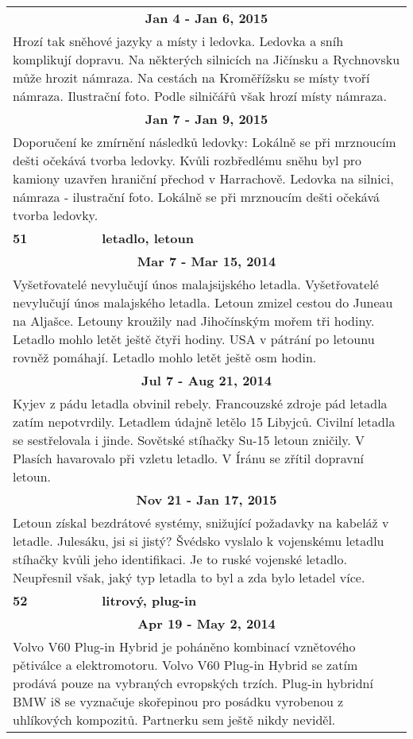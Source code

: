 \begin{tabularx}{\linewidth}{l l}
\multicolumn{2}{c}{\bf Jan 4 - Jan 6, 2015} \\
\multicolumn{2}{p{\linewidth}}{Hrozí tak sněhové jazyky a místy i ledovka. Ledovka a sníh komplikují dopravu. Na některých silnicích na Jičínsku a Rychnovsku může hrozit námraza. Na cestách na Kroměřížsku se místy tvoří námraza. Ilustrační foto. Podle silničářů však hrozí místy námraza.} \\ \midrule
\multicolumn{2}{c}{\bf Jan 7 - Jan 9, 2015} \\
\multicolumn{2}{p{\linewidth}}{Doporučení ke zmírnění následků ledovky: Lokálně se při mrznoucím dešti očekává tvorba ledovky. Kvůli rozbředlému sněhu byl pro kamiony uzavřen hraniční přechod v Harrachově. Ledovka na silnici, námraza - ilustrační foto. Lokálně se při mrznoucím dešti očekává tvorba ledovky.} \\ \midrule[1.5pt]

\bf 51 & \bf letadlo, letoun \\ \midrule
\multicolumn{2}{c}{\bf Mar 7 - Mar 15, 2014} \\
\multicolumn{2}{p{\linewidth}}{Vyšetřovatelé nevylučují únos malajsijského letadla. Vyšetřovatelé nevylučují únos malajského letadla. Letoun zmizel cestou do Juneau na Aljašce. Letouny kroužily nad Jihočínským mořem tři hodiny. Letadlo mohlo letět ještě čtyři hodiny. USA v pátrání po letounu rovněž pomáhají. Letadlo mohlo letět ještě osm hodin.} \\ \midrule
\multicolumn{2}{c}{\bf Jul 7 - Aug 21, 2014} \\
\multicolumn{2}{p{\linewidth}}{Kyjev z pádu letadla obvinil rebely. Francouzské zdroje pád letadla zatím nepotvrdily. Letadlem údajně letělo 15 Libyjců. Civilní letadla se sestřelovala i jinde. Sovětské stíhačky Su-15 letoun zničily. V Plasích havarovalo při vzletu letadlo. V Íránu se zřítil dopravní letoun.} \\ \midrule
\multicolumn{2}{c}{\bf Nov 21 - Jan 17, 2015} \\
\multicolumn{2}{p{\linewidth}}{Letoun získal bezdrátové systémy, snižující požadavky na kabeláž v letadle. Julesáku, jsi si jistý? Švédsko vyslalo k vojenskému letadlu stíhačky kvůli jeho identifikaci. Je to ruské vojenské letadlo. Neupřesnil však, jaký typ letadla to byl a zda bylo letadel více.} \\ \midrule[1.5pt]

\bf 52 & \bf litrový, plug-in \\ \midrule
\multicolumn{2}{c}{\bf Apr 19 - May 2, 2014} \\
\multicolumn{2}{p{\linewidth}}{Volvo V60 Plug-in Hybrid je poháněno kombinací vznětového pětiválce a elektromotoru. Volvo V60 Plug-in Hybrid se zatím prodává pouze na vybraných evropských trzích. Plug-in hybridní BMW i8 se vyznačuje skořepinou pro posádku vyrobenou z uhlíkových kompozitů. Partnerku sem ještě nikdy neviděl.} \\ \midrule[1.5pt]


\end{tabularx}
